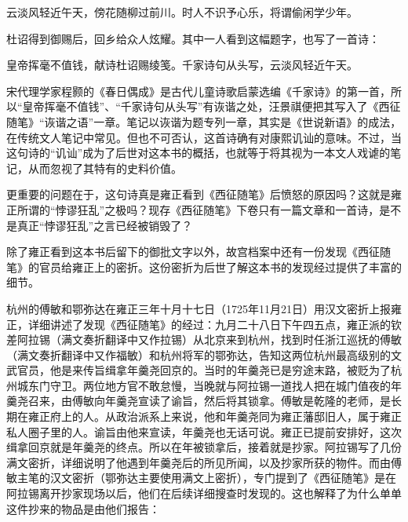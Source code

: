 
\begin{bookquote}云淡风轻近午天，傍花随柳过前川。时人不识予心乐，将谓偷闲学少年。\end{bookquote}


杜诏得到御赐后，回乡给众人炫耀。其中一人看到这幅题字，也写了一首诗：



\begin{bookquote}皇帝挥毫不值钱，献诗杜诏赐绫笺。千家诗句从头写，云淡风轻近午天。\end{bookquote}


宋代理学家程颢的《春日偶成》是古代儿童诗歌启蒙选编《千家诗》的第一首，所以“皇帝挥毫不值钱”、“千家诗句从头写”有诙谐之处，汪景祺便把其写入了《西征随笔》“诙谐之语”一章。笔记以诙谐为题专列一章，其实是《世说新语》的成法，在传统文人笔记中常见。但也不可否认，这首诗确有对康熙讥讪的意味。不过，当这句诗的“讥讪”成为了后世对这本书的概括，也就等于将其视为一本文人戏谑的笔记，从而忽视了其特有的史料价值。



更重要的问题在于，这句诗真是雍正看到《西征随笔》后愤怒的原因吗？这就是雍正所谓的“悖谬狂乱”之极吗？现存《西征随笔》下卷只有一篇文章和一首诗，是不是真正“悖谬狂乱”之言已经被销毁了？



除了雍正看到这本书后留下的御批文字以外，故宫档案中还有一份发现《西征随笔》的官员给雍正上的密折。这份密折为后世了解这本书的发现经过提供了丰富的细节。



杭州的傅敏和鄂弥达在雍正三年十月十七日（1725年11月21日）用汉文密折上报雍正，详细讲述了发现《西征随笔》的经过：九月二十八日下午四五点，雍正派的钦差阿拉锡（满文奏折翻译中又作拉锡）从北京来到杭州，找到时任浙江巡抚的傅敏（满文奏折翻译中又作福敏）和杭州将军的鄂弥达，告知这两位杭州最高级别的文武官员，他是来传旨缉拿年羹尧回京的。当时的年羹尧已是穷途末路，被贬为了杭州城东门守卫。两位地方官不敢怠慢，当晚就与阿拉锡一道找人把在城门值夜的年羹尧召来，由傅敏向年羹尧宣读了谕旨，然后将其锁拿。傅敏是乾隆的老师，是长期在雍正府上的人。从政治派系上来说，他和年羹尧同为雍正藩邸旧人，属于雍正私人圈子里的人。谕旨由他来宣读，年羹尧也无话可说。雍正已提前安排好，这次缉拿回京就是年羹尧的终点。所以在年被锁拿后，接着就是抄家。阿拉锡写了几份满文密折，详细说明了他遇到年羹尧后的所见所闻，以及抄家所获的物件。而由傅敏主笔的汉文密折（鄂弥达主要使用满文上密折），专门提到了《西征随笔》是在阿拉锡离开抄家现场以后，他们在后续详细搜查时发现的。这也解释了为什么单单这件抄来的物品是由他们报告：



